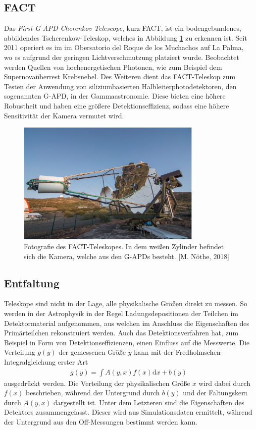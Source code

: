 \subsection{FACT}
Das \textit{First G-APD Cherenkov Telescope}, \cite{Anderhub_2013} kurz FACT, ist ein bodengebundenes, abbildendes Tscherenkow-Teleskop, welches in Abbildung \ref{fig:FACT} zu erkennen ist. Seit 2011 operiert es im  im Obersatorio del Roque de los Muchachos auf La Palma, wo es aufgrund der geringen Lichtverschmutzung platziert wurde.
Beobachtet werden Quellen von hochenergetischen Photonen, wie zum Beispiel dem Supernovaüberrest Krebsnebel. Des Weiteren dient das FACT-Teleskop zum Testen der Anwendung von siliziumbasierten Halbleiterphotodetektoren, den sogenannten G-APD, in der Gammaastronomie. Diese bieten eine höhere Robustheit und haben eine größere Detektionseffizienz, sodass eine höhere Sensitivität der Kamera vermutet wird. \cite{FACTside, Anderhub_2013} 
\begin{figure}
  \centering
  \includegraphics[width=0.8\textwidth]{graphics/Max.png}
  \caption{ Fotografie des FACT-Teleskopes. In dem weißen Zylinder befindet sich die Kamera, welche aus den G-APDs besteht. [M. Nöthe, 2018]}
  \label{fig:FACT}
\end{figure}


\subsection{Entfaltung}
Teleskope sind nicht in der Lage, alle physikalische Größen direkt zu messen. So werden in der Astrophysik in der Regel Ladungsdepositionen der Teilchen im Detektormaterial aufgenommen, aus welchen im Anschluss die Eigenschaften des Primärteilchen rekonstruiert werden. Auch das Detektionsverfahren hat, zum Beispiel in Form von Detektionseffizienzen,  einen Einfluss auf die Messwerte.
Die Verteilung $g(y)$ der gemessenen Größe $y$ kann mit der Fredholmschen-Integralgleichung erster Art
\begin{align}
	g(y)=\int A(y,x)f(x)\text{d}x + b(y)
	\label{eqn:1}
\end{align}
ausgedrückt werden. Die Verteilung der physikalischen Größe $x$ wird dabei durch $f(x)$ beschrieben, während der Untergrund durch $b(y)$ und der Faltungskern durch $A(y,x)$ dargestellt ist. Unter dem Letzteren sind die Eigenschaften des Detektors zusammengefasst. Dieser wird aus Simulationsdaten ermittelt, während der Untergrund aus den Off-Messungen bestimmt werden kann.

